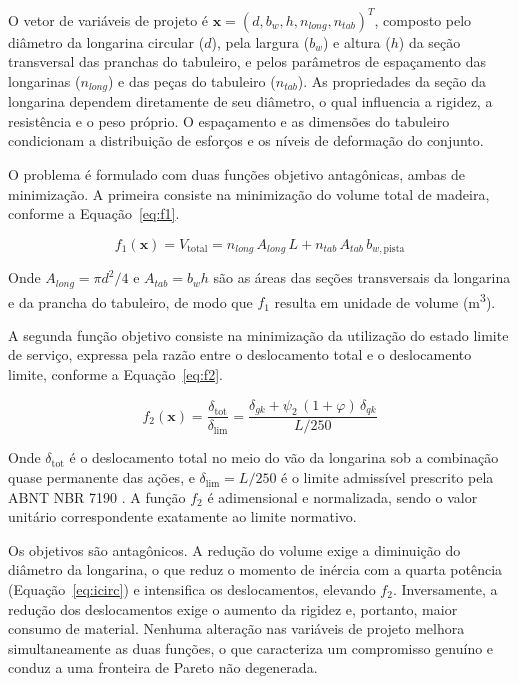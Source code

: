 O vetor de variáveis de projeto é $\mathbf{x} = (d, b_w, h, n_{long}, n_{tab})^T$, composto pelo diâmetro da longarina circular ($d$), pela largura ($b_w$) e altura ($h$) da seção transversal das pranchas do tabuleiro, e pelos parâmetros de espaçamento das longarinas ($n_{long}$) e das peças do tabuleiro ($n_{tab}$). As propriedades da seção da longarina dependem diretamente de seu diâmetro, o qual influencia a rigidez, a resistência e o peso próprio. O espaçamento e as dimensões do tabuleiro condicionam a distribuição de esforços e os níveis de deformação do conjunto.

O problema é formulado com duas funções objetivo antagônicas, ambas de minimização. A primeira consiste na minimização do volume total de madeira, conforme a Equação~\eqref{eq:f1}.

\begin{equation}
f_1(\mathbf{x}) = V_{\mathrm{total}} = n_{long}\,A_{long}\,L + n_{tab}\,A_{tab}\,b_{w,\mathrm{pista}}
\label{eq:f1}
\end{equation}

Onde $A_{long} = \pi d^2/4$ e $A_{tab} = b_w h$ são as áreas das seções transversais da longarina e da prancha do tabuleiro, de modo que $f_1$ resulta em unidade de volume (m\textsuperscript{3}).

A segunda função objetivo consiste na minimização da utilização do estado limite de serviço, expressa pela razão entre o deslocamento total e o deslocamento limite, conforme a Equação~\eqref{eq:f2}.

\begin{equation}
f_2(\mathbf{x}) = \frac{\delta_{\mathrm{tot}}}{\delta_{\mathrm{lim}}} = \frac{\delta_{gk} + \psi_2\,(1+\varphi)\,\delta_{qk}}{L/250}
\label{eq:f2}
\end{equation}

Onde $\delta_{\mathrm{tot}}$ é o deslocamento total no meio do vão da longarina sob a combinação quase permanente das ações, e $\delta_{\mathrm{lim}} = L/250$ é o limite admissível prescrito pela ABNT NBR 7190 \parencite{NBR7190-1:2022}. A função $f_2$ é adimensional e normalizada, sendo o valor unitário correspondente exatamente ao limite normativo.

Os objetivos são antagônicos. A redução do volume exige a diminuição do diâmetro da longarina, o que reduz o momento de inércia com a quarta potência (Equação~\eqref{eq:icirc}) e intensifica os deslocamentos, elevando $f_2$. Inversamente, a redução dos deslocamentos exige o aumento da rigidez e, portanto, maior consumo de material. Nenhuma alteração nas variáveis de projeto melhora simultaneamente as duas funções, o que caracteriza um compromisso genuíno e conduz a uma fronteira de Pareto não degenerada.

